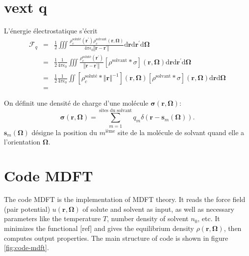 \section{vext q}

L'énergie électrostatique s'écrit
\begin{eqnarray}
\mathcal{F}_{q} & = & \frac{1}{2}\iiint\frac{\rho_{c}^{\textrm{soluté}}\left(\boldsymbol{r^{\prime}}\right)\rho_{c}^{\textrm{solvant}}\left(\boldsymbol{r},\boldsymbol{\Omega}\right)}{4\pi\epsilon_{0}\left\Vert \boldsymbol{r}-\boldsymbol{r^{\prime}}\right\Vert }\textrm{d}\boldsymbol{r}\textrm{d}\boldsymbol{r^{\prime}}\textrm{d}\boldsymbol{\Omega}\\
 & = & \frac{1}{2}\frac{1}{4\pi\epsilon_{0}}\iiint\frac{\rho_{c}^{\textrm{soluté}}\left(\boldsymbol{r^{\prime}}\right)}{\left\Vert \boldsymbol{r}-\boldsymbol{r^{\prime}}\right\Vert }\left[\rho^{\textrm{solvant}}*\sigma\right]\left(\boldsymbol{r},\boldsymbol{\Omega}\right)\textrm{d}\boldsymbol{r}\textrm{d}\boldsymbol{r^{\prime}}\textrm{d}\boldsymbol{\Omega}\\
 & = & \frac{1}{2}\frac{1}{4\pi\epsilon_{0}}\iint\left[\rho_{c}^{\textrm{soluté}}*\left\Vert \boldsymbol{r}\right\Vert ^{-1}\right]\left(\boldsymbol{r},\boldsymbol{\Omega}\right)\left[\rho^{\textrm{solvant}}*\sigma\right]\left(\boldsymbol{r},\boldsymbol{\Omega}\right)\textrm{d}\boldsymbol{r}\textrm{d}\boldsymbol{\Omega}\\
 & =
\end{eqnarray}


On définit une densité de charge d'une molécule $\boldsymbol{\sigma}\left(\boldsymbol{r},\boldsymbol{\Omega}\right)$:
\begin{equation}
\boldsymbol{\sigma}\left(\boldsymbol{r},\boldsymbol{\Omega}\right)=\sum_{m=1}^{\textrm{sites du solvant}}q_{m}\delta\left(\boldsymbol{r}-\boldsymbol{s}_{m}\left(\boldsymbol{\Omega}\right)\right).
\end{equation}
$\boldsymbol{s}_{m}\left(\boldsymbol{\Omega}\right)$ désigne la position
du $m^{\textrm{ième}}$ site de la molécule de solvant quand elle
a l'orientation $\boldsymbol{\Omega}$.


\section{Code MDFT}

The code MDFT is the implementation of \acs{MDFT} theory. It reads
the force field (pair potential) $u(\mathbf{r},\mathbf{\Omega})$
of solute and solvent as input, as well as necessary parameters like
the temperature $T$, number density of solvent $n_{0}$, etc. It
minimizes the functional {[}ref{]} and gives the equilibrium density
$\rho(\mathbf{r},\mathbf{\Omega})$, then computes output properties.
The main structure of code is shown in figure \ref{fig:code-mdft}.

